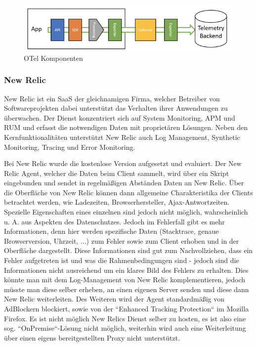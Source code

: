 \begin{figure}[H]
	\centering
	\includegraphics[width=0.75\linewidth]{img/03_methoden/dynatrace_otel-components.png}
	\caption{OTel Komponenten \cite{DynatraceOTelComponents}}
	\label{fig:otel-components}
\end{figure}


\subsubsection{New Relic}

New Relic \cite{NewRelic} ist ein SaaS der gleichnamigen Firma, welcher Betreiber von Softwareprojekten dabei unterstützt das Verhalten ihrer Anwendungen zu überwachen. Der Dienst konzentriert sich auf System Monitoring, APM und RUM und erfasst die notwendigen Daten mit proprietären Lösungen. Neben den Kernfunktionalitäten unterstützt New Relic auch Log Management, Synthetic Monitoring, Tracing und Error Monitoring.


Bei New Relic wurde die kostenlose Version aufgesetzt und evaluiert. Der New Relic Agent, welcher die Daten beim Client sammelt, wird über ein Skript eingebunden und sendet in regelmäßigen Abständen Daten an New Relic. Über die Oberfläche von New Relic können dann allgemeine Charakteristika der Clients betrachtet werden, wie Ladezeiten, Browserhersteller, Ajax-Antwortzeiten. Spezielle Eigenschaften eines einzelnen sind jedoch nicht möglich, wahrscheinlich u. A. aus Aspekten des Datenschutzes. Jedoch im Fehlerfall gibt es mehr Informationen, denn hier werden spezifische Daten (Stacktrace, genaue Browserversion, Uhrzeit, ...) zum Fehler sowie zum Client erhoben und in der Oberfläche dargestellt. Diese Informationen sind gut zum Nachvollziehen, dass ein Fehler aufgetreten ist und was die Rahmenbedingungen sind - jedoch sind die Informationen nicht ausreichend um ein klares Bild des Fehlers zu erhalten. Dies könnte man mit dem Log-Management von New Relic komplementieren, jedoch müsste man diese selber erheben, an einen eigenen Server senden und diese dann New Relic weiterleiten. Des Weiteren wird der Agent standardmäßig von AdBlockern blockiert, sowie von der ``Enhanced Tracking Protection`` im Mozilla Firefox. Es ist nicht möglich New Relics Dienst selber zu hosten, es ist also eine sog. ``OnPremise``-Lösung nicht möglich, weiterhin wird auch eine Weiterleitung über einen eigens bereitgestellten Proxy nicht unterstützt.

